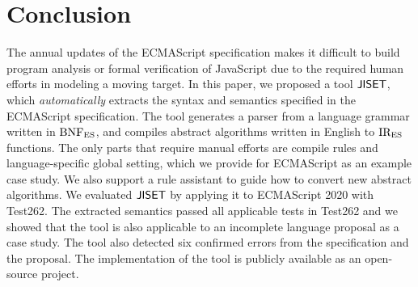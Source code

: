 \section{Conclusion}\label{sec:conclude}
The annual updates of the ECMAScript specification makes it difficult to
build program analysis or formal verification of JavaScript due to the
required human efforts in modeling a moving target.  In this paper,
we proposed a tool \( \text{\sf JISET} \), which \emph{automatically} extracts the
syntax and semantics specified in the ECMAScript specification.  The tool
generates a parser from a language grammar written in \( \text{BNF}_{\text{ES}} \), and
compiles abstract algorithms written in English to \( \text{IR}_\text{ES} \) functions.
The only parts that require manual efforts are compile rules and
language-specific global setting, which we provide for ECMAScript
as an example case study.  We also support a rule assistant to guide
how to convert new abstract algorithms.  We evaluated \( \text{\sf JISET} \) by
applying it to ECMAScript 2020 with Test262.  The extracted semantics
passed all  applicable tests in Test262 and we showed
that the tool is also applicable to an incomplete language proposal as
a case study.  The tool also detected six confirmed errors from the
specification and the proposal. The implementation of the tool is
publicly available as an open-source project.
